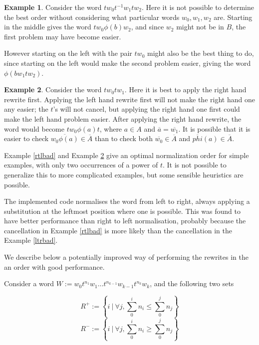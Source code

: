 \documentclass[11pt]{article} %
\theoremstyle{definition}
\theoremstyle{definition}
\theoremstyle{definition}
\theoremstyle{definition}
\theoremstyle{definition}
\theoremstyle{definition}
\newtheorem{exmpl}{Example}[theorem]
\begin{document}
\begin{exmpl}
  Consider the word $tw_0t^{-1}w_1tw_2$. Here it is not possible to determine the best order without
  considering what particular words $w_0, w_1, w_2$ are. Starting in the middle gives the word
  $tw_0\phi(b)w_2$, and since $w_2$ might not be in $B$, the first problem may have become easier.

  However starting on the left with the pair $tw_0$
  might also be the best thing to do, since starting on the left would
  make the second problem easier, giving the word $\phi(bw_1 t w_2)$.
\end{exmpl}

\begin{exmpl}\label{ltrbad2}
  Consider the word $tw_0tw_1$. Here it is best to apply the right hand rewrite first.
  Applying the left hand rewrite first will not make the right hand one any easier; the $t$'s will
  not cancel, but applying the right hand one first could make the left hand problem easier.
  After applying the right hand rewrite, the word would become $tw_0\phi(a)t$, where $a \in A$
  and $\overline{a} = \overline{w_1}$. It is possible that it is easier to check $\overline{w_0\phi(a)} \in \overline{A}$
  than to check both $\overline{w_0} \in \overline{A}$ and $\overline{phi}(a) \in \overline{A}$.
\end{exmpl}

Example \ref{rtlbad} and Example \ref{ltrbad2} give an optimal normalization order
for simple examples, with only two occurrences of a power of $t$.
It is not possible to generalize this to more complicated examples,
but some sensible heuristics are possible.

The implemented code normalises the word from left to right, always applying
a substitution at the leftmost position where one is possible. This was found to have better
performance than right to left normalisation, probably because the cancellation
in Example \ref{rtlbad} is more likely than the cancellation in the Example \ref{ltrbad}.

We describe below a potentially improved way of performing the rewrites in the
an order with good performance.

Consider a word $W := w_0t^{n_1}w_1 \dots t^{n_{k-1}}w_{k-1}t^{n_k}w_k$, and the
following two sets

\begin{equation}
    R^{+} := \left\{ i \ | \ \forall j, \sum_0^i n_i \le \sum_0^j n_j\right\}
\end{equation}
\begin{equation}
    R^{-} := \left\{ i \ | \ \forall j, \sum_0^i n_i \ge \sum_0^j n_j\right\}
\end{equation}
\end{document}
